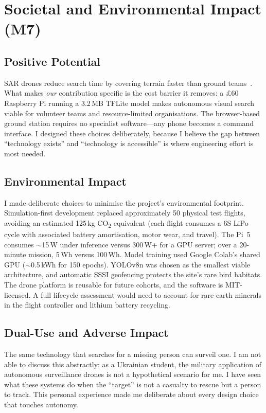 \section{Societal and Environmental Impact (M7)}
\label{sec:impact}

\subsection{Positive Potential}

SAR drones reduce search time by covering terrain faster than ground teams~\cite{sar_drones_review,goodrich2008sar}. What makes \emph{our} contribution specific is the cost barrier it removes: a \pounds60 Raspberry Pi running a 3.2\,MB TFLite model makes autonomous visual search viable for volunteer teams and resource-limited organisations. The browser-based ground station requires no specialist software---any phone becomes a command interface. I designed these choices deliberately, because I believe the gap between ``technology exists'' and ``technology is accessible'' is where engineering effort is most needed.

\subsection{Environmental Impact}

I made deliberate choices to minimise the project's environmental footprint. Simulation-first development replaced approximately 50 physical test flights, avoiding an estimated 125\,kg CO\textsubscript{2} equivalent (each flight consumes a 6S LiPo cycle with associated battery amortisation, motor wear, and travel). The Pi~5 consumes ${\sim}$15\,W under inference versus 300\,W+ for a GPU server; over a 20-minute mission, 5\,Wh versus 100\,Wh. Model training used Google Colab's shared GPU (${\sim}$0.5\,kWh for 150 epochs). YOLOv8n was chosen as the smallest viable architecture, and automatic SSSI geofencing protects the site's rare bird habitats. The drone platform is reusable for future cohorts, and the software is MIT-licensed. A full lifecycle assessment would need to account for rare-earth minerals in the flight controller and lithium battery recycling.

\subsection{Dual-Use and Adverse Impact}

The same technology that searches for a missing person can surveil one. I am not able to discuss this abstractly: as a Ukrainian student, the military application of autonomous surveillance drones is not a hypothetical scenario for me. I have seen what these systems do when the ``target'' is not a casualty to rescue but a person to track. This personal experience made me deliberate about every design choice that touches autonomy.

